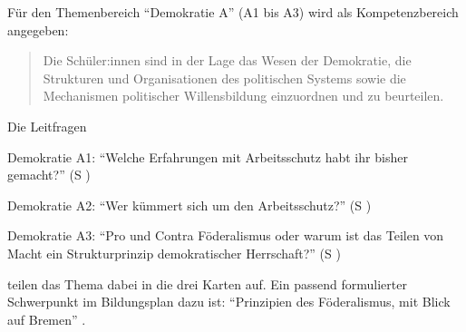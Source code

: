 Für den Themenbereich \enquote{Demokratie A} (A1 bis A3) wird als Kompetenzbereich angegeben:
\begin{quote}
    Die Schüler:innen sind in der Lage das Wesen der Demokratie, die Strukturen und Organisationen des politischen Systems sowie die Mechanismen politischer Willensbildung einzuordnen und zu beurteilen.
    
    \autocite[im Bildungsplan:][16]{bplan}
\end{quote}


Die Leitfragen
\begin{myenumerate}
    \item Demokratie A1: \enquote{Welche Erfahrungen mit Arbeitsschutz habt ihr bisher gemacht?} (\gls{S} \pageref{DEMOKRATIE-A1})
    \item Demokratie A2: \enquote{Wer kümmert sich um den Arbeitsschutz?} (\gls{S} \pageref{DEMOKRATIE-A2})
    \item Demokratie A3: \enquote{Pro und Contra Föderalismus oder warum ist das Teilen von Macht ein Strukturprinzip demokratischer Herrschaft?} (\gls{S} \pageref{DEMOKRATIE-A3})
\end{myenumerate}
teilen das Thema dabei in die drei Karten auf.
Ein passend formulierter Schwerpunkt im Bildungsplan dazu ist: \enquote{Prinzipien des Föderalismus, mit Blick auf Bremen} \autocite[16]{bplan}.
\bigskip

